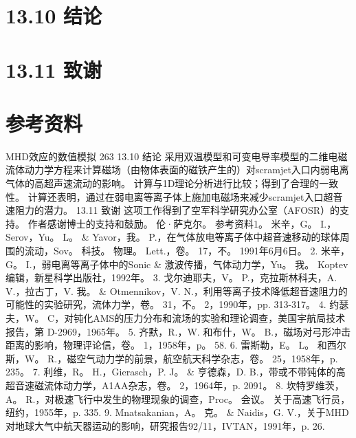 \documentclass[UTF8,11pt,a4paper,openany,fontset=fandol]{ctexbook}
\begin{document}
\section{13.10 结论}
\section{13.11 致谢}
\section{参考资料}
MHD效应的数值模拟 263 13.10 结论 采用双温模型和可变电导率模型的二维电磁流体动力学方程来计算磁场（由物体表面的磁铁产生的）对scramjet入口内弱电离气体的高超声速流动的影响。 计算与1D理论分析进行比较；得到了合理的一致性。 计算还表明，通过在弱电离等离子体上施加电磁场来减少scramjet入口超音速阻力的潜力。 13.11 致谢 这项工作得到了空军科学研究办公室（AFOSR）的支持。 作者感谢博士的支持和鼓励。 伦·萨克尔。 参考资料1。 米辛，G。 I.，Serov，Yu。 L。 \& Yavor，我。 P.，在气体放电等离子体中超音速移动的球体周围的流动，Sov。 科技。 物理。 Lett.，卷。 17，不。 1991年6月6日。 2. 米辛，G。 I.，弱电离等离子体中的Sonic \& 激波传播，气体动力学，Yu。 我。 Koptev编辑，新星科学出版社，1992年。 3. 戈尔迪耶夫，V。 P.，克拉斯林科夫，A. V.，拉古丁，V. 我。 \& Otmennikov，V. N.，利用等离子技术降低超音速阻力的可能性的实验研究，流体力学，卷。 31，不。 2，1990年，pp. 313-317。 4. 约瑟夫，W。 C，对钝化AMS的压力分布和流场的实验和理论调查，美国宇航局技术报告，第 D-2969，1965年。 5. 齐默，R.，W. 和布什，W。 B.，磁场对弓形冲击距离的影响，物理评论信，卷。 1，1958年，p。 58. 6. 雷斯勒，E。 L。 和西尔斯，W。 R.，磁空气动力学的前景，航空航天科学杂志，卷。 25，1958年，p. 235。 7. 利维，R。 H.，Gierasch，P. J。 \& 亨德森，D. B.，带或不带钝体的高超音速磁流体动力学，A1AA杂志，卷。 2，1964年，p. 2091。 8. 坎特罗维茨，A。 R.，对极速飞行中发生的物理现象的调查，Proc。 会议。 关于高速飞行员，纽约，1955年，p. 335. 9. Mnatsakanian，A。 克。 \& Naidis，G. V.，关于MHD对地球大气中航天器运动的影响，研究报告92/11，IVTAN，1991年，p. 26.
\end{document}
